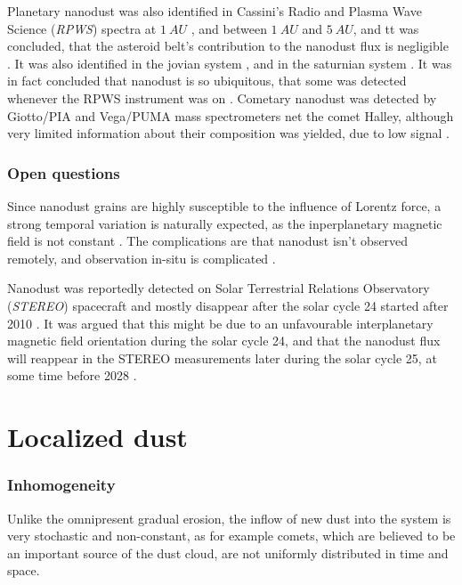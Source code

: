 Planetary nanodust was also identified in Cassini's Radio and Plasma Wave Science (\textit{RPWS}) spectra 
at $\SI{1}{AU}$ \citep{schippers2014nanodust}, and  between $\SI{1}{AU}$ and $\SI{5}{AU}$, and tt was concluded, that the asteroid belt's contribution to the nanodust flux is negligible \citep{schippers2015nanodust}. It was also identified in the jovian system \citep{meyer2009detecting}, and in the saturnian system \citep{kempf2005high}. It was in fact concluded that nanodust is so ubiquitous, that some was detected whenever the RPWS instrument was on \citep{schippers2015nanodust}. Cometary nanodust was detected by Giotto/PIA and Vega/PUMA mass spectrometers net the comet Halley, although very limited information about their composition was yielded, due to low signal \cite{utterback1990attogram}.

\subsubsection{Open questions}

Since nanodust grains are highly susceptible to the influence of Lorentz force, a strong temporal variation is naturally expected, as the inperplanetary magnetic field is not constant \citep{poppe2020effects}. The complications are that nanodust isn't observed remotely, and observation in-situ is complicated \citep{pantellini2012nano,kellogg2016dust,kellogg2017note}. 

Nanodust was reportedly detected on Solar Terrestrial Relations Observatory (\textit{STEREO}) spacecraft \citep{meyer2009dust} and mostly disappear after the solar cycle 24 started after 2010 \citep{zaslavsky2012interplanetary}. It was argued that this might be due to an unfavourable interplanetary magnetic field orientation during the solar cycle 24, and that the nanodust flux will reappear in the STEREO measurements later during the solar cycle 25, at some time before 2028 \citep{poppe2022effects}.

\section{Localized dust}

\subsubsection{Inhomogeneity}

Unlike the omnipresent gradual erosion, the inflow of new dust into the system is very stochastic and non-constant, as for example comets, which are believed to be an important source of the dust cloud, are not uniformly distributed in time and space.

